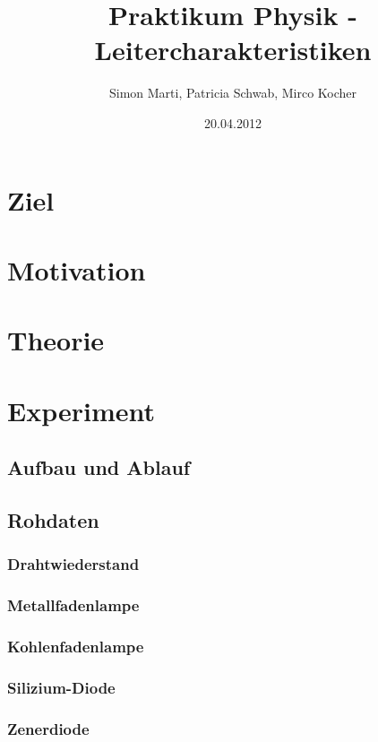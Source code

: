 \documentclass[12pt,a4paper]{article}
\title{Praktikum Physik - Leitercharakteristiken}
\author{Simon Marti, Patricia Schwab, Mirco Kocher}
\date{20.04.2012}
\begin{document}
\maketitle

\section*{Ziel}


\section*{Motivation}


\section*{Theorie}


\section*{Experiment}

\subsection*{Aufbau und Ablauf}

\subsection*{Rohdaten}

\subsubsection*{Drahtwiederstand}

\subsubsection*{Metallfadenlampe}

\subsubsection*{Kohlenfadenlampe}

\subsubsection*{Silizium-Diode}

\subsubsection*{Zenerdiode}
\end{document}

